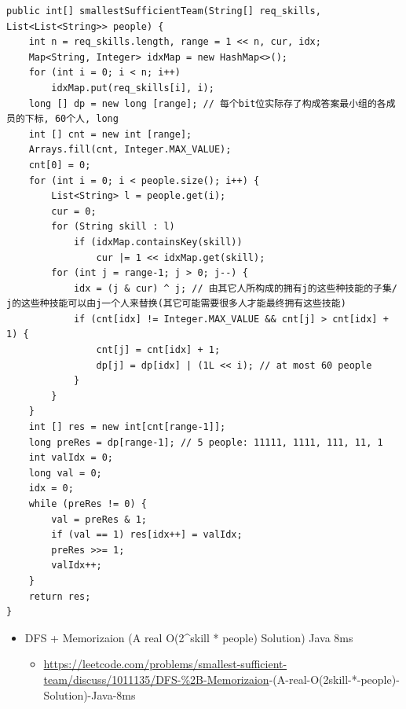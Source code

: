 \documentclass[9pt, b5paaper]{book}
\begin{document}
\begin{verbatim}
public int[] smallestSufficientTeam(String[] req_skills, List<List<String>> people) {
    int n = req_skills.length, range = 1 << n, cur, idx;
    Map<String, Integer> idxMap = new HashMap<>();
    for (int i = 0; i < n; i++) 
        idxMap.put(req_skills[i], i);
    long [] dp = new long [range]; // 每个bit位实际存了构成答案最小组的各成员的下标, 60个人, long
    int [] cnt = new int [range];
    Arrays.fill(cnt, Integer.MAX_VALUE);
    cnt[0] = 0;
    for (int i = 0; i < people.size(); i++) {
        List<String> l = people.get(i);
        cur = 0;
        for (String skill : l) 
            if (idxMap.containsKey(skill))
                cur |= 1 << idxMap.get(skill);
        for (int j = range-1; j > 0; j--) {
            idx = (j & cur) ^ j; // 由其它人所构成的拥有j的这些种技能的子集/ j的这些种技能可以由j一个人来替换(其它可能需要很多人才能最终拥有这些技能)
            if (cnt[idx] != Integer.MAX_VALUE && cnt[j] > cnt[idx] + 1) {
                cnt[j] = cnt[idx] + 1;
                dp[j] = dp[idx] | (1L << i); // at most 60 people
            }
        }
    }
    int [] res = new int[cnt[range-1]];
    long preRes = dp[range-1]; // 5 people: 11111, 1111, 111, 11, 1
    int valIdx = 0;
    long val = 0;
    idx = 0;
    while (preRes != 0) {
        val = preRes & 1;
        if (val == 1) res[idx++] = valIdx;
        preRes >>= 1;
        valIdx++;
    }
    return res;
}
\end{verbatim}
\begin{itemize}
\item DFS + Memorizaion (A real O(2\^{}skill * people) Solution) Java 8ms
\begin{itemize}
\item \url{https://leetcode.com/problems/smallest-sufficient-team/discuss/1011135/DFS-\%2B-Memorizaion}-(A-real-O(2skill-*-people)-Solution)-Java-8ms
\end{itemize}
\end{itemize}
\end{document}
